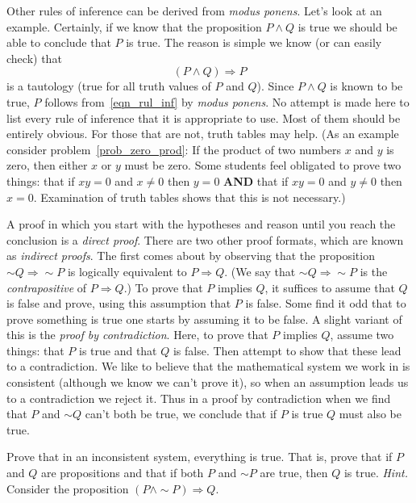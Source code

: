 Other rules of inference can be derived from \emph{modus ponens}. Let's look at an
example. Certainly, if we know that the proposition $P \land Q$ is true we should be able
to conclude that $P$ is true.  The reason is simple we know (or can easily check) that
  \begin{equation}\label{eqn_rul_inf}
        (P \land Q) \Rightarrow P
  \end{equation}
is a tautology (true for all truth values of $P$ and $Q$).  Since $P \land Q$ is known to be
true, $P$ follows from~\eqref{eqn_rul_inf} by \emph{modus ponens}.  No attempt is made here to
list every rule of inference that it is appropriate to use.  Most of them should be entirely
obvious.  For those that are not, truth tables may help.  (As an example consider
problem~\ref{prob_zero_prod}: If the product of two numbers $x$ and $y$ is zero, then either
$x$ or $y$ must be zero.  Some students feel obligated to prove two things: that if $xy=0$ and
$x \neq 0$ then $y=0$ \textbf{AND} that if $xy=0$ and $y \neq 0$ then $x=0$. Examination of
truth tables shows that this is not necessary.)

A proof in which you start with the hypotheses and reason until you reach the conclusion is a
\emph{direct proof}.  There are two other proof formats, which are known as
\emph{indirect proofs}.  The first comes about by observing that the proposition $\sim Q
\Rightarrow \sim P$ is logically equivalent to $P \Rightarrow Q$.  (We say that $\sim Q
\Rightarrow \sim P$ is the
\emph{contrapositive} of $P \Rightarrow Q$.)  To prove that $P$ implies $Q$, it suffices to
assume that $Q$ is false and prove, using this assumption that $P$ is false.  Some find it odd
that to prove something is true one starts by assuming it to be false.  A slight variant of
this is the
\emph{proof by contradiction}.  Here, to prove that $P$ implies $Q$, assume two things: that
$P$ is true and that $Q$ is false. Then attempt to show that these lead to a contradiction.
We like to believe that the mathematical system we work in is consistent (although we know we
can't prove it), so when an assumption leads us to a contradiction we reject it.  Thus in a
proof by contradiction when we find that $P$ and $\sim Q$ can't both be true, we conclude that
if $P$ is true $Q$ must also be true.

\begin{prob} Prove that in an inconsistent system, everything is true.  That is, prove that if
$P$ and $Q$ are propositions and that if both $P$ and $\sim P$ are true, then $Q$ is true.
\emph{Hint.} Consider the proposition $(P \land \sim P) \Rightarrow Q$.
\end{prob}

